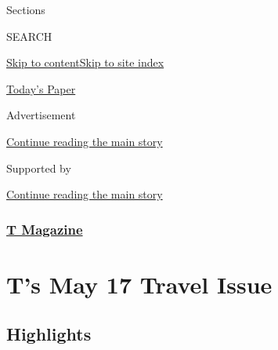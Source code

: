 Sections

SEARCH

\protect\hyperlink{site-content}{Skip to
content}\protect\hyperlink{site-index}{Skip to site index}

\href{https://myaccount.nytimes.com/auth/login?response_type=cookie\&client_id=vi}{}

\href{https://www.nytimes.com/section/todayspaper}{Today's Paper}

Advertisement

\protect\hyperlink{after-top}{Continue reading the main story}

Supported by

\protect\hyperlink{after-sponsor}{Continue reading the main story}

\hypertarget{t-magazine}{%
\subsubsection{\texorpdfstring{\href{/section/t-magazine}{T
Magazine}}{T Magazine}}\label{t-magazine}}

\hypertarget{ts-may-17-travel-issue}{%
\section{T's May 17 Travel Issue}\label{ts-may-17-travel-issue}}

\hypertarget{highlights}{%
\subsection{Highlights}\label{highlights}}

